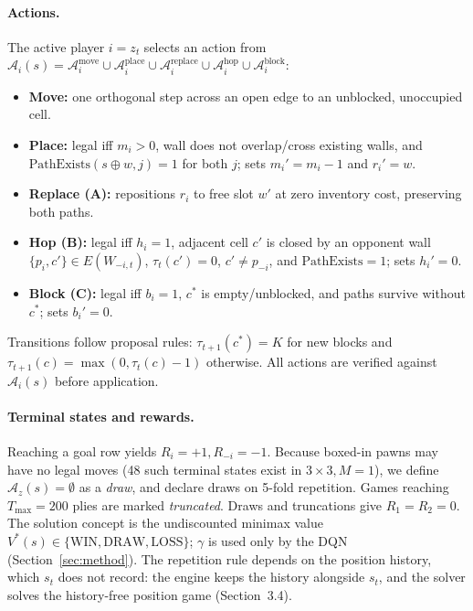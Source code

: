\documentclass[10pt]{article}
\begin{document}
\paragraph{Actions.} The active player $i=z_t$ selects an action from $\mathcal{A}_i(s)=\mathcal{A}^{\text{move}}_i\cup\mathcal{A}^{\text{place}}_i\cup\mathcal{A}^{\text{replace}}_i\cup\mathcal{A}^{\text{hop}}_i\cup\mathcal{A}^{\text{block}}_i$:
\begin{itemize}[leftmargin=1.5em]
\item \textbf{Move:} one orthogonal step across an open edge to an unblocked, unoccupied cell.
\item \textbf{Place:} legal iff $m_i>0$, wall does not overlap/cross existing walls, and $\mathrm{PathExists}(s\oplus w,j)=1$ for both $j$; sets $m_i'=m_i-1$ and $r_i'=w$.
\item \textbf{Replace (A):} repositions $r_i$ to free slot $w'$ at zero inventory cost, preserving both paths.
\item \textbf{Hop (B):} legal iff $h_i=1$, adjacent cell $c'$ is closed by an opponent wall $\{p_i,c'\}\in E(W_{-i,t})$, $\tau_t(c')=0$, $c'\neq p_{-i}$, and $\mathrm{PathExists}=1$; sets $h_i'=0$.
\item \textbf{Block (C):} legal iff $b_i=1$, $c^*$ is empty/unblocked, and paths survive without $c^*$; sets $b_i'=0$.
\end{itemize}
Transitions follow proposal rules: $\tau_{t+1}(c^*)=K$ for new blocks and $\tau_{t+1}(c)=\max(0,\tau_t(c)-1)$ otherwise. All actions are verified against $\mathcal{A}_i(s)$ before application.

\paragraph{Terminal states and rewards.} Reaching a goal row yields $R_i=+1, R_{-i}=-1$. Because boxed-in pawns may have no legal moves (48 such terminal states exist in $3\times3, M=1$), we define $\mathcal{A}_{z}(s)=\emptyset$ as a \emph{draw}, and declare draws on 5-fold repetition. Games reaching $T_{\max}=200$ plies are marked \emph{truncated}. Draws and truncations give $R_1=R_2=0$. The solution concept is the undiscounted minimax value $V^*(s)\in\{\text{WIN},\text{DRAW},\text{LOSS}\}$; $\gamma$ is used only by the DQN (Section~\ref{sec:method}). The repetition rule depends on the position history, which $s_t$ does not record: the engine keeps the history alongside $s_t$, and the solver solves the history-free position game (Section~3.4).
\end{document}
